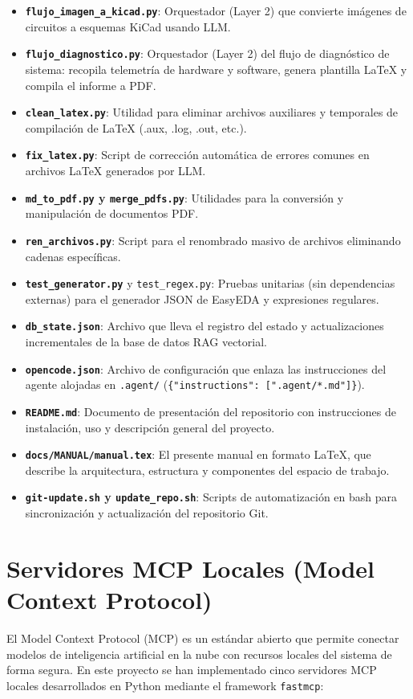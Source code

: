\documentclass[12pt,a4paper]{article}
\begin{document}
\begin{itemize}
    \item \textbf{\texttt{flujo\_imagen\_a\_kicad.py}}: Orquestador (Layer 2) que convierte imágenes de circuitos a esquemas KiCad usando LLM.
    \item \textbf{\texttt{flujo\_diagnostico.py}}: Orquestador (Layer 2) del flujo de diagnóstico de sistema: recopila telemetría de hardware y software, genera plantilla LaTeX y compila el informe a PDF.
    \item \textbf{\texttt{clean\_latex.py}}: Utilidad para eliminar archivos auxiliares y temporales de compilación de LaTeX (.aux, .log, .out, etc.).
    \item \textbf{\texttt{fix\_latex.py}}: Script de corrección automática de errores comunes en archivos LaTeX generados por LLM.
    \item \textbf{\texttt{md\_to\_pdf.py} y \texttt{merge\_pdfs.py}}: Utilidades para la conversión y manipulación de documentos PDF.
    \item \textbf{\texttt{ren\_archivos.py}}: Script para el renombrado masivo de archivos eliminando cadenas específicas.
    \item \textbf{\texttt{test\_generator.py}} y \texttt{test\_regex.py}: Pruebas unitarias (sin dependencias externas) para el generador JSON de EasyEDA y expresiones regulares.
    \item \textbf{\texttt{db\_state.json}}: Archivo que lleva el registro del estado y actualizaciones incrementales de la base de datos RAG vectorial.
    \item \textbf{\texttt{opencode.json}}: Archivo de configuración que enlaza las instrucciones del agente alojadas en \texttt{.agent/} (\texttt{\{"instructions": [".agent/*.md"]\}}).
    \item \textbf{\texttt{README.md}}: Documento de presentación del repositorio con instrucciones de instalación, uso y descripción general del proyecto.
    \item \textbf{\texttt{docs/MANUAL/manual.tex}}: El presente manual en formato LaTeX, que describe la arquitectura, estructura y componentes del espacio de trabajo.
    \item \textbf{\texttt{git-update.sh} y \texttt{update\_repo.sh}}: Scripts de automatización en bash para sincronización y actualización del repositorio Git.
\end{itemize}

\section{Servidores MCP Locales (Model Context Protocol)}
El Model Context Protocol (MCP) es un estándar abierto que permite conectar modelos de inteligencia artificial en la nube con recursos locales del sistema de forma segura. En este proyecto se han implementado cinco servidores MCP locales desarrollados en Python mediante el framework \texttt{fastmcp}:
\end{document}
